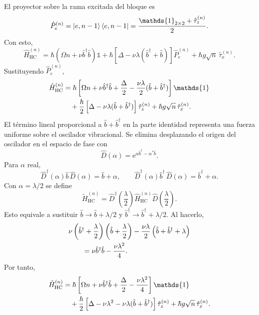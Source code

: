 \documentclass[11pt]{article}
\newcommand{\ee}{\mathrm{e}}
\newcommand{\bdag}{\hat b^\dagger}
\begin{document}
El proyector sobre la rama excitada del bloque es
\begin{equation}
  \hat P_e^{(n)}
  =
  \ket{e,n-1}\bra{e,n-1}
  =
  \frac{\mathds{1}_{2\times2}+\hat\tau_z^{(n)}}{2}.
\end{equation}
Con esto,
\begin{equation}
  \hat H_{\mathrm{HC}}^{(n)}
  =
  \hbar\left(\Omega n+\nu\bdag\hat b\right)\mathds{1}
  +
  \hbar\left[\Delta-\nu\lambda(\bdag+\hat b)\right]\hat P_e^{(n)}
  +
  \hbar g\sqrt n\,\hat\tau_x^{(n)}.
\end{equation}
Sustituyendo $\hat P_e^{(n)}$,
\begin{align}
  \hat H_{\mathrm{HC}}^{(n)}
  &=
  \hbar\left[
  \Omega n+\nu\bdag\hat b
  +
  \frac{\Delta}{2}
  -
  \frac{\nu\lambda}{2}(\hat b+\bdag)
  \right]\mathds{1}
  \notag\\
  &\quad
  +
  \frac{\hbar}{2}
  \left[
  \Delta-\nu\lambda(\hat b+\bdag)
  \right]\hat\tau_z^{(n)}
  +
  \hbar g\sqrt n\,\hat\tau_x^{(n)}.
\end{align}
El t\'ermino lineal proporcional a $\hat b+\bdag$ en la parte identidad
representa una fuerza uniforme sobre el oscilador vibracional. Se elimina
desplazando el origen del oscilador en el espacio de fase con
\begin{equation}
  \hat D(\alpha)=\ee^{\alpha\bdag-\alpha^*\hat b}.
\end{equation}
Para $\alpha$ real,
\begin{equation}
  \hat D^\dagger(\alpha)\hat b\,\hat D(\alpha)=\hat b+\alpha,
  \qquad
  \hat D^\dagger(\alpha)\bdag\,\hat D(\alpha)=\bdag+\alpha.
\end{equation}
Con $\alpha=\lambda/2$ se define
\begin{equation}
  \tilde H_{\mathrm{HC}}^{(n)}
  =
  \hat D^\dagger\!\left(\frac{\lambda}{2}\right)
  \hat H_{\mathrm{HC}}^{(n)}
  \hat D\!\left(\frac{\lambda}{2}\right).
\end{equation}
Esto equivale a sustituir
$\hat b\to\hat b+\lambda/2$ y $\bdag\to\bdag+\lambda/2$. Al hacerlo,
\begin{align}
  &\nu
  \left(\bdag+\frac{\lambda}{2}\right)
  \left(\hat b+\frac{\lambda}{2}\right)
  -
  \frac{\nu\lambda}{2}
  \left(\hat b+\bdag+\lambda\right)
  \notag\\
  &\qquad
  =
  \nu\bdag\hat b-\frac{\nu\lambda^2}{4}.
\end{align}
Por tanto,
\begin{align}
  \tilde H_{\mathrm{HC}}^{(n)}
  &=
  \hbar\left[
  \Omega n+\nu\bdag\hat b
  +
  \frac{\Delta}{2}
  -
  \frac{\nu\lambda^2}{4}
  \right]\mathds{1}
  \notag\\
  &\quad
  +
  \frac{\hbar}{2}
  \left[
  \Delta-\nu\lambda^2-\nu\lambda(\hat b+\bdag)
  \right]\hat\tau_z^{(n)}
  +
  \hbar g\sqrt n\,\hat\tau_x^{(n)}.
\end{align}
\end{document}
